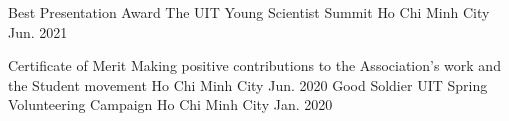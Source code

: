\begin{cvhonors}
    
  \cvhonor
    {Best Presentation Award} %
    {The UIT Young Scientist Summit} %
    {Ho Chi Minh City} %
    {Jun. 2021} %

  \cvhonor
    {Certificate of Merit} %
    {Making positive contributions to the Association's work and the Student movement} %
    {Ho Chi Minh City} %
    {Jun. 2020} %
  \cvhonor
    {Good Soldier} %
    {UIT Spring Volunteering Campaign} %
    {Ho Chi Minh City} %
    {Jan. 2020} %
    

\end{cvhonors}
